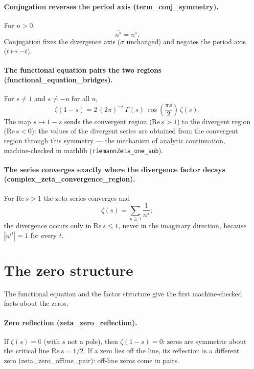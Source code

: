 \documentclass[sigplan,10pt,anonymous,review]{acmart}
\begin{document}
\paragraph{Conjugation reverses the period axis
(term\_conj\_symmetry).} For $n > 0$,
\begin{equation*}
  \overline{n^s} = n^{\overline{s}}.
\end{equation*}
Conjugation fixes the divergence axis ($\sigma$ unchanged) and negates
the period axis ($t \mapsto -t$).

\paragraph{The functional equation pairs the two regions
(functional\_equation\_bridges).} For $s \neq 1$ and $s \neq -n$
for all $n$,
\begin{equation*}
  \zeta(1-s) = 2\,(2\pi)^{-s}\,\Gamma(s)\,\cos\!\left(\frac{\pi s}{2}\right)\, \zeta(s).
\end{equation*}
The map $s \mapsto 1-s$ sends the convergent region
($\mathrm{Re}\,s > 1$) to the divergent region ($\mathrm{Re}\,s <
0$): the values of the divergent series are obtained from the
convergent region through this symmetry --- the mechanism of analytic
continuation, machine-checked in mathlib
(\texttt{riemannZeta\_one\_sub}).

\paragraph{The series converges exactly where the divergence factor
decays (complex\_zeta\_convergence\_region).}
For $\mathrm{Re}\,s > 1$ the zeta series converges and
\begin{equation*}
  \zeta(s) = \sum_{n \geq 1} \frac{1}{n^s};
\end{equation*}
the divergence occurs only in $\mathrm{Re}\,s \leq 1$, never in the
imaginary direction, because $|n^{it}| = 1$ for every $t$.

\section{The zero structure}

The functional equation and the factor structure give the first
machine-checked facts about the zeros.

\paragraph{Zero reflection (zeta\_zero\_reflection).}
If $\zeta(s) = 0$ (with $s$ not a pole), then $\zeta(1-s) = 0$: zeros
are symmetric about the critical line $\mathrm{Re}\,s = 1/2$. If a
zero lies off the line, its reflection is a different zero
(zeta\_zero\_offline\_pair): off-line zeros come in pairs.
\end{document}
